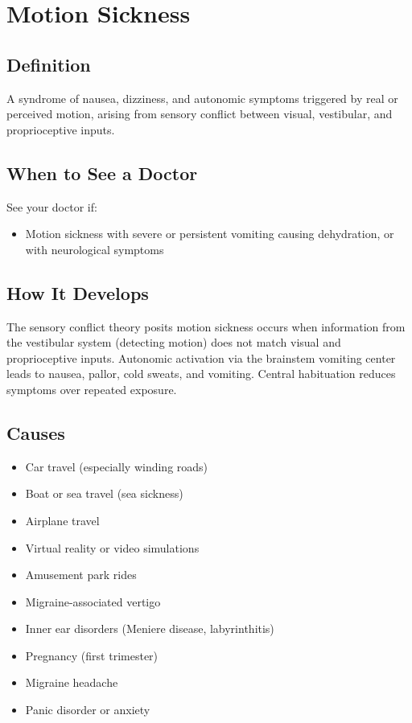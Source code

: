 \chapter{Motion Sickness}

\section*{Definition}
A syndrome of nausea, dizziness, and autonomic symptoms triggered by real or perceived motion, arising from sensory conflict between visual, vestibular, and proprioceptive inputs.

\section*{When to See a Doctor}
See your doctor if:
\begin{itemize}
  \item Motion sickness with severe or persistent vomiting causing dehydration, or with neurological symptoms
\end{itemize}

\section*{How It Develops}
The sensory conflict theory posits motion sickness occurs when information from the vestibular system (detecting motion) does not match visual and proprioceptive inputs. Autonomic activation via the brainstem vomiting center leads to nausea, pallor, cold sweats, and vomiting. Central habituation reduces symptoms over repeated exposure.

\section*{Causes}
\begin{itemize}
  \item Car travel (especially winding roads)
  \item Boat or sea travel (sea sickness)
  \item Airplane travel
  \item Virtual reality or video simulations
  \item Amusement park rides
  \item Migraine-associated vertigo
  \item Inner ear disorders (Meniere disease, labyrinthitis)
  \item Pregnancy (first trimester)
  \item Migraine headache
  \item Panic disorder or anxiety
\end{itemize}

